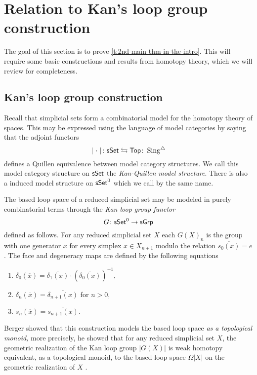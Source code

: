 
\section{Relation to Kan's loop group construction}

The goal of this section is to prove \cref{t:2nd main thm in the intro}.
This will require some basic constructions and results from homotopy theory, which we will review for completeness.

\subsection{Kan's loop group construction}

Recall that simplicial sets form a combinatorial model for the homotopy theory of spaces.
This may be expressed using the language of model categories by saying that the adjoint functors
\begin{equation*}
\vert{\ \cdot\ }\vert \colon \mathsf{sSet} \leftrightarrows \mathsf{Top} \colon \operatorname{Sing^{\triangle}}
\end{equation*}
defines a Quillen equivalence between model category structures.
We call this model category structure on $\mathsf{sSet}$ the \textit{Kan-Quillen model structure}.
There is also a induced model structure on $\mathsf{sSet}^0$ which we call by the same name.

The based loop space of a reduced simplicial set may be modeled in purely combinatorial terms through the \textit{Kan loop group functor} 
\begin{equation*}
G \colon \mathsf{sSet}^0 \to \mathsf{sGrp}
\end{equation*}
defined as follows.
For any reduced simplicial set $X$ each $G(X)_n$ is the group with one generator $\overline{x}$ for every simplex $x \in X_{n+1}$ modulo the relation $\overline{s_0(x)} = e$.
The face and degeneracy maps are defined by the following equations
\begin{enumerate}
    \item $\delta_0(\overline{x}) = \overline{\delta_1(x)} \cdot (\overline{\delta_0(x)})^{-1}$,
    \item $\delta_n(\overline{x})= \overline{\delta_{n+1}(x)}$ for $n >0$,
    \item $s_n(\overline{x})= \overline{s_{n+1}(x)}$.
\end{enumerate}

Berger showed that this construction models the based loop space \textit{as a topological monoid,} more precisely, he showed that for any reduced simplicial set $X$, the geometric realization of the Kan loop group $|G(X)|$ is weak homotopy equivalent, as a topological monoid, to the based loop space $\Omega|X|$ on the geometric realization of $X$ \cite{berger1995loops}.

